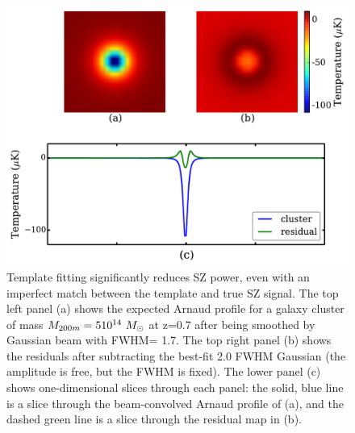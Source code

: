 \begin{figure}
\includegraphics[width=\linewidth, keepaspectratio]{figs/template_fitting.pdf}
 \caption{Template fitting significantly reduces SZ power, even with an imperfect match between the template and true SZ signal. 
The top left panel (a) shows the expected Arnaud profile for a galaxy cluster of mass $M_{200m} = 5 10^{14}~ {M}_{\odot}$ at z=0.7 after being smoothed by Gaussian beam with FWHM= 1\arcmin.7.
The top right panel (b) shows the residuals after subtracting the best-fit 2\arcmin.0 FWHM Gaussian (the amplitude is free, but the FWHM is fixed). 
The lower panel (c) shows one-dimensional slices through each panel: the solid, blue line is a slice through the beam-convolved Arnaud profile of (a), and the dashed green line is a slice through the residual map in (b). 
 } 
\label{fig:residual}
\end{figure}

